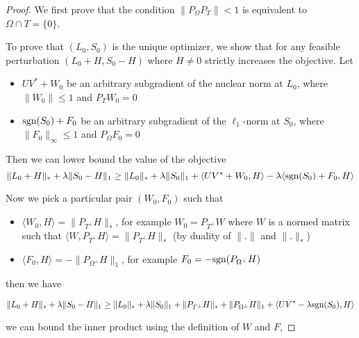 \documentclass{../common/projectreport}
\begin{document}
\begin{proof}
We first prove that the condition $\|P_\Omega P_T\| < 1$ is equivalent to $\Omega \cap T = \{0\}$. 

To prove that $(L_0, S_0)$ is the unique optimizer, we show that for any feasible perturbation $(L_0 + H, S_0 - H)$ where $H \neq 0$ strictly increases the objective. Let 
\begin{itemize}
\item $UV^* + W_0$ be an arbitrary subgradient of the nuclear norm at $L_0$, where $\|W_0\| \leq 1$ and $P_T W_0 = 0$
\item $\text{sgn} (S_0) + F_0$ be an arbitrary subgradient of the $\ell_1$-norm at $S_0$, where $\|F_0\|_\infty \leq 1$ and $P_\Omega F_0 = 0$
\end{itemize}

Then we can lower bound the value of the objective
\[
\|L_0 + H\|_* + \lambda \|S_0 - H\|_1 \geq \|L_0\|_* + \lambda \|S_0\|_1 + \langle UV^* + W_0, H\rangle - \lambda \langle \text{sgn}(S_0) + F_0, H\rangle
\]

Now we pick a particular pair $(W_0, F_0)$ such that
\begin{itemize}
\item $\langle W_0, H \rangle = \|P_{T^\perp} H\|_*$, for example $W_0 = P_{T^\perp} W$ where $W$ is a normed matrix such that $\langle W, P_{T^\perp} H \rangle = \|P_{T^\perp} H\|_*$ (by duality of $\|.\|$ and $\|.\|_*$)
\item $\langle F_0, H \rangle = -\|P_{\Omega^\perp} H\|_1$, for example $F_0 = -\text{sgn}(P_{\Omega^\perp} H)$
\end{itemize}
then we have

\[
\|L_0 + H\|_* + \lambda \|S_0 - H\|_1 \geq \|L_0\|_* + \lambda \|S_0\|_1  + \|P_{T^\perp} H\|_* + \|P_{\Omega^\perp} H\|_1 + \langle UV^* - \lambda  \text{sgn}(S_0), H\rangle
\]

we can bound the inner product using the definition of $W$ and $F$,


\end{proof}
\end{document}
